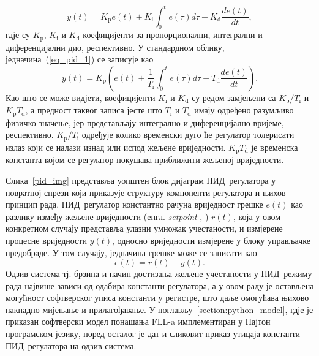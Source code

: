 \documentclass[master]{finthesis}
\makeatletter
\newcommand*{\engl}[2][\@empty]{%
    \edef\theacronym{#1}%
    (енгл. \foreignlanguage{english}{\emph{#2}%
    \ifx\theacronym\@empty \else , #1\fi})%
}
\def \FLL  {FLL} %
\def \PID  {ПИД} %
\makeatother
\begin{document}
\begin{equation} 
	\label{eq_pid_1}
	y(t)= K_\text{p}e(t) + K_\text{i}\int_{0}^{t}e(\tau)d\tau + K_\text{d}\frac{de(t)}{dt},
\end{equation}
гдје су $K_\text{p}$, $K_\text{i}$ и $K_\text{d}$ коефицијенти за пропорционални, интегрални и диференцијални дио, респективно. У стандардном облику, једначина~(\ref{eq_pid_1}) се записује као
\begin{equation} 
	\label{eq_pid_2}
	y(t)= K_\text{p}\left(e(t) + \frac{1}{T_\text{i}}\int_{0}^{t}e(\tau)d\tau + T_\text{d}\frac{de(t)}{dt}\right).
\end{equation}
Као што се може видјети, коефицијенти $K_\text{i}$ и $K_\text{d}$ су редом замјењени са $K_\text{p}/T_\text{i}$ и $K_\text{p}T_\text{d}$, а предност таквог записа јесте што $T_\text{i}$ и $T_\text{d}$ имају одређено разумљиво физичко значење, јер представљају интегрално и диференцијално вријеме, респективно. $K_\text{p}/T_\text{i}$ одређује колико временски дуго ће регулатор толерисати излаз који се налази изнад или испод жељене вриједности. $K_\text{p}T_\text{d}$ је временска константа којом се регулатор покушава приближити жељеној вриједности. \par

Слика~\ref{pid_img} представља уопштен блок дијаграм \PID\ регулатора у повратној спрези који приказује структуру компоненти регулатора и њихов принцип рада. \PID\ регулатор константно рачуна вриједност грешке $e(t)$ као разлику између жељене вриједности \engl{setpoint} $r(t)$, која у овом конкретном случају представља улазни умножак учестаности, и измјерене процесне вриједности $y(t)$, односно вриједности измјерене у блоку управљачке предобраде. У том случају, једначина грешке може се записати као
\begin{equation} 
	\label{eq_pid_err)}
	e(t) = r(t) - y(t).
\end{equation}
Одзив система тј. брзина и начин достизања жељене учестаности у \PID\ режиму рада највише зависи од одабира константи регулатора, а у овом раду је остављена могућност софтверског уписа константи у регистре, што даље омогућава њихово накнадно мијењање и прилагођавање. У поглављу~\ref{section:python_model}, гдје је приказан софтверски модел понашања \FLL-a имплементиран у Пајтон програмском језику, поред осталог је дат и сликовит приказ утицаја константи \PID\ регулатора на одзив система.
\end{document}
